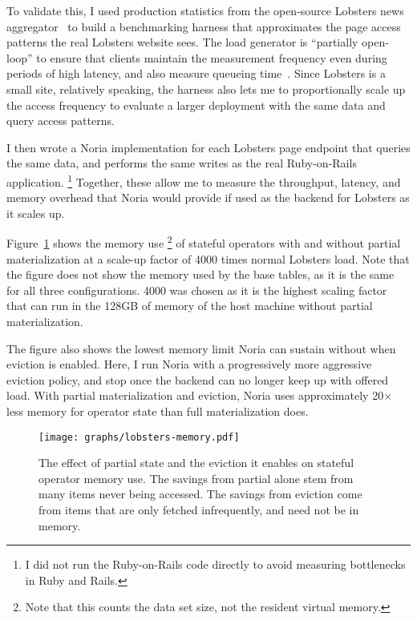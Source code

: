 To validate this, I used production statistics from the open-source Lobsters
news aggregator~\cite{lobsters,lobsters-data} to build a benchmarking harness
that approximates the page access patterns the real Lobsters website sees. The
load generator is ``partially open-loop'' to ensure that clients maintain the
measurement frequency even during periods of high latency, and also measure
queueing time~\cite{frank-open-loop,open-loop-cautionary-tale}. Since Lobsters
is a small site, relatively speaking, the harness also lets me to proportionally
scale up the access frequency to evaluate a larger deployment with the same
data and query access patterns.

I then wrote a Noria implementation for each Lobsters page endpoint that
queries the same data, and performs the same writes as the real Ruby-on-Rails
application.%
\footnote{I did not run the Ruby-on-Rails code directly to avoid measuring
bottlenecks in Ruby and Rails.}
Together, these allow me to measure the throughput, latency, and memory overhead
that Noria would provide if used as the backend for Lobsters as it scales up.

Figure~\ref{f:lobsters-memory} shows the memory use%
\footnote{Note that this counts the data set size, not the resident virtual
memory.}
of stateful operators with
and without partial materialization at a scale-up factor of 4000 times normal
Lobsters load. Note that the figure does not show the memory used by the base
tables, as it is the same for all three configurations. 4000 was chosen as it is
the highest scaling factor that can run in the 128GB of memory of the host
machine without partial materialization.

The figure also shows the lowest memory limit Noria can sustain without when
eviction is enabled. Here, I run Noria with a progressively more aggressive
eviction policy, and stop once the backend can no longer keep up with offered
load. With partial materialization and eviction, Noria uses approximately
20$\times$ less memory for operator state than full materialization does.

\begin{figure}[h]
  \centering
  \texttt{[image: graphs/lobsters-memory.pdf]}
  \caption{The effect of partial state and the eviction it enables on stateful
  operator memory use. The savings from partial alone stem from many items never
  being accessed. The savings from eviction come from items that are only
  fetched infrequently, and need not be in memory.}
  \label{f:lobsters-memory}
\end{figure}

